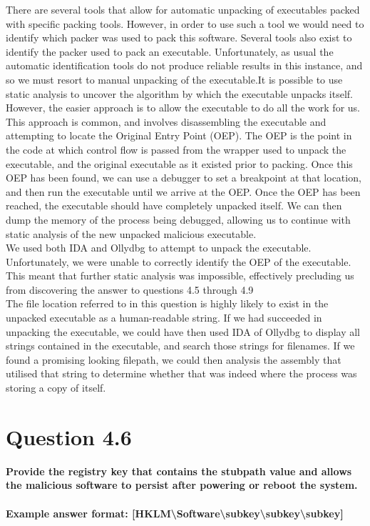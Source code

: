 There are several tools that allow for automatic unpacking of executables packed with specific packing tools. However, in order to use such a tool we would need to identify which packer was used to pack this software. Several tools also exist to identify the packer used to pack an executable. Unfortunately, as usual the automatic identification tools do not produce reliable results in this instance, and so we must resort to manual unpacking of the executable.It is possible to use static analysis to uncover the algorithm by which the executable unpacks itself. However, the easier approach is to allow the executable to do all the work for us. This approach is common, and involves disassembling the executable and attempting to locate the Original Entry Point (OEP). The OEP is the point in the code at which control flow is passed from the wrapper used to unpack the executable, and the original executable as it existed prior to packing. Once this OEP has been found, we can use a debugger to set a breakpoint at that location, and then run the executable until we arrive at the OEP. Once the OEP has been reached, the executable should have completely unpacked itself. We can then dump the memory of the process being debugged, allowing us to continue with static analysis of the new unpacked malicious executable.\\


We used both IDA and Ollydbg to attempt to unpack the executable. Unfortunately, we were unable to correctly identify the OEP of the executable. This meant that further static analysis was impossible, effectively precluding us from discovering the answer to questions 4.5 through 4.9\\ 


The file location referred to in this question is highly likely to exist in the unpacked executable as a human-readable string. If we had succeeded in unpacking the executable, we could have then used IDA of Ollydbg to display all strings contained in the executable, and search those strings for filenames. If we found a promising looking filepath, we could then analysis the assembly that utilised that string to determine whether that was indeed where the process was storing a copy of itself. 
\section{Question 4.6}
\textbf{Provide the registry key that contains the stubpath value and allows the
malicious software to persist after powering or reboot the system.
\\\\
Example answer format:
[HKLM\textbackslash{}Software\textbackslash{}subkey\textbackslash{}subkey\textbackslash{}subkey]}
